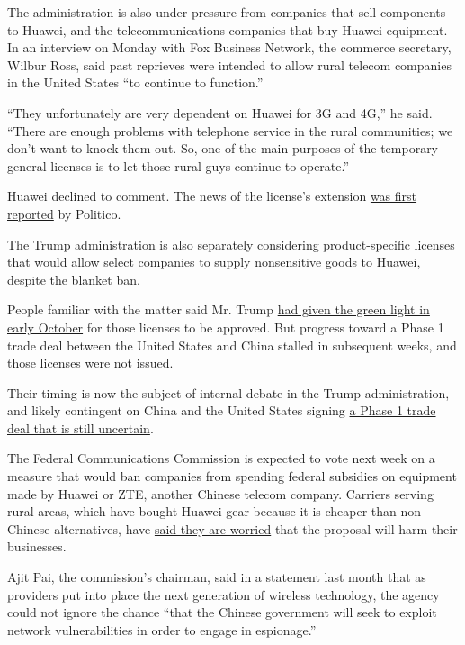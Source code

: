 The administration is also under pressure from companies that sell
components to Huawei, and the telecommunications companies that buy
Huawei equipment. In an interview on Monday with Fox Business Network,
the commerce secretary, Wilbur Ross, said past reprieves were intended
to allow rural telecom companies in the United States ``to continue to
function.''

``They unfortunately are very dependent on Huawei for 3G and 4G,'' he
said. ``There are enough problems with telephone service in the rural
communities; we don't want to knock them out. So, one of the main
purposes of the temporary general licenses is to let those rural guys
continue to operate.''

Huawei declined to comment. The news of the license's extension
\href{https://www.politico.com/news/2019/11/14/huawei-trade-waiver-070982}{was
first reported} by Politico.

The Trump administration is also separately considering product-specific
licenses that would allow select companies to supply nonsensitive goods
to Huawei, despite the blanket ban.

People familiar with the matter said Mr. Trump
\href{https://www.nytimes.com/2019/10/09/us/politics/trump-huawei-trade.html}{had
given the green light in early October} for those licenses to be
approved. But progress toward a Phase 1 trade deal between the United
States and China stalled in subsequent weeks, and those licenses were
not issued.

Their timing is now the subject of internal debate in the Trump
administration, and likely contingent on China and the United States
signing
\href{https://www.nytimes.com/2019/11/12/business/trump-trade-economy.html}{a
Phase 1 trade deal that is still uncertain}.

The Federal Communications Commission is expected to vote next week on a
measure that would ban companies from spending federal subsidies on
equipment made by Huawei or ZTE, another Chinese telecom company.
Carriers serving rural areas, which have bought Huawei gear because it
is cheaper than non-Chinese alternatives, have
\href{https://www.nytimes.com/2019/05/25/technology/huawei-rural-wireless-service.html?module=inline}{said
they are worried} that the proposal will harm their businesses.

Ajit Pai, the commission's chairman, said in a statement last month that
as providers put into place the next generation of wireless technology,
the agency could not ignore the chance ``that the Chinese government
will seek to exploit network vulnerabilities in order to engage in
espionage.''

